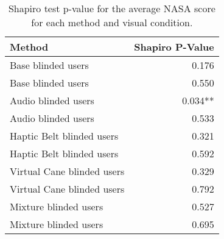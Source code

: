 
\begin{table}[!htb]
\centering
\caption{Shapiro test p-value for the average NASA score for each method and visual condition.}
\label{tab:shapiro_nasa_score_avg}
\begin{tabular}{lr}
\toprule
                    Method & Shapiro P-Value \\
\midrule
        Base blinded users &           0.176 \\
        Base blinded users &           0.550 \\
       Audio blinded users &         0.034** \\
       Audio blinded users &           0.533 \\
 Haptic Belt blinded users &           0.321 \\
 Haptic Belt blinded users &           0.592 \\
Virtual Cane blinded users &           0.329 \\
Virtual Cane blinded users &           0.792 \\
     Mixture blinded users &           0.527 \\
     Mixture blinded users &           0.695 \\
\bottomrule
\end{tabular}
\end{table}

